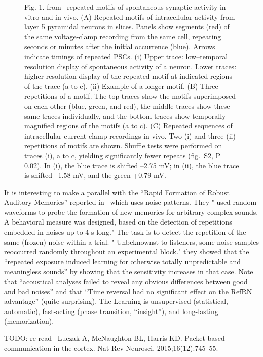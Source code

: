 \documentclass[brainsci, %
               review,submit,pdftex,moreauthors%
               ]{Definitions/mdpi}
\begin{document}
\begin{figure}
\centering
\caption{Fig. 1. from~\citep{ikegaya_synfire_2004} repeated motifs of spontaneous synaptic activity in vitro and in vivo. (A) Repeated motifs of intracellular activity from layer 5 pyramidal neurons in slices. Panels show segments (red) of the same voltage-clamp recording from the same cell, repeating seconds or minutes after the initial occurrence (blue). Arrows indicate timings of repeated PSCs. (i) Upper trace: low--temporal resolution display of spontaneous activity of a neuron. Lower traces: higher resolution display of the repeated motif at indicated regions of the trace (a to c). (ii) Example of a longer motif. (B) Three repetitions of a motif. The top traces show the motifs superimposed on each other (blue, green, and red), the middle traces show these same traces individually, and the bottom traces show temporally magnified regions of the motifs (a to c). (C) Repeated sequences of intracellular current-clamp recordings in vivo. Two (i) and three (ii) repetitions of motifs are shown. Shuffle tests were performed on traces (i), a to c, yielding significantly fewer repeats (fig.~S2, P  0.02). In (i), the blue trace is shifted --2.75 mV; in (ii), the blue trace is shifted --1.58 mV, and the green +0.79 mV.}\label{fig:Ikegaya2004}
\end{figure}

It is interesting to make a parallel with the ``Rapid Formation of Robust Auditory Memories'' reported in~\citep{agus_rapid_2010} which uses noise patterns. They " used random waveforms to probe the formation of new memories for arbitrary complex sounds. A behavioral measure was designed, based on the detection of repetitions embedded in noises up to 4 s long." The task is to detect the repetition of the same (frozen) noise within a trial. " Unbeknownst to listeners, some noise samples reoccurred randomly throughout an experimental block." they showed that the ``repeated exposure induced learning for otherwise totally unpredictable and meaningless sounds'' by showing that the sensitivity increases in that case. Note that ``acoustical analyses failed to reveal any obvious differences between good and bad noises'' and that ``Time reversal had no significant effect on the RefRN advantage'' (quite surprising). The Learning is unsupervised (statistical, automatic), fast-acting (phase transition, ``insight''), and long-lasting (memorization).


TODO: re-read~\citep{luczak_packet-based_2015} Luczak A, McNaughton BL, Harris KD. Packet-based communication in the cortex. Nat Rev Neurosci. 2015;16(12):745--55.
\end{document}
